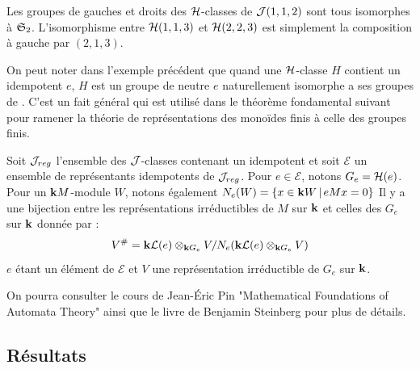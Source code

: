 \documentclass{article}
\begin{document}
	\begin{lined}
		\begin{ex}\label{ex:green}
			Les groupes de \schu gauches et droits des $\mathcal{H}$-classes de $\mathcal{J}(1,1,2)$ sont tous isomorphes à $\mathfrak{S}_2$. L'isomorphisme entre $\mathcal{H}(1,1,3)$ et $\mathcal{H}(2,2,3)$ est simplement la composition à gauche par $(2,1,3)$.
		\end{ex}
	\end{lined}
	
	On peut noter dans l'exemple précédent que quand une $\mathcal{H}$-classe $H$ contient un idempotent $e$, $H$ est un groupe de neutre $e$ naturellement isomorphe a ses groupes de \schu. C'est un fait général qui est utilisé dans le théorème fondamental suivant pour ramener la théorie de représentations des monoïdes finis à celle des groupes finis.
	
	\begin{thm}\label{thm:MCP}
		Soit $\mathcal{J}_{reg}$ l'ensemble des $\mathcal{J}$-classes contenant un idempotent et soit $\mathcal{E}$ un ensemble de représentants idempotents de $\mathcal{J}_{reg}$.
		Pour $e \in \mathcal{E}$, notons $G_e = \mathcal{H}(e)$. Pour un $\mathbf{k} M$-module $W$, notons également $N_e(W) = \{x \in \mathbf{k} W\,\vert\, eMx = 0 \}$
		Il y a une bijection entre les représentations irréductibles de $M$ sur $\mathbf{k}$ et celles des $G_e$ sur $\mathbf{k}$ donnée par :
		\[V^{\#} = \mathbf{k} \mathcal{L}(e)\otimes_{\mathbf{k} G_e} V / N_e(\mathbf{k} \mathcal{L}(e)\otimes_{\mathbf{k} G_e} V)\]
		$e$ étant un élément de $\mathcal{E}$ et $V$ une représentation irréductible de $G_e$ sur $\mathbf{k}$.
	\end{thm}
	
	On pourra consulter le cours de Jean-\'Eric Pin "Mathematical Foundations of Automata Theory" \cite{Pin:Automata} ainsi que le livre de Benjamin Steinberg \cite{steinberg2016representation} pour plus de détails.
	
	\subsection*{Résultats}
	
\end{document}
